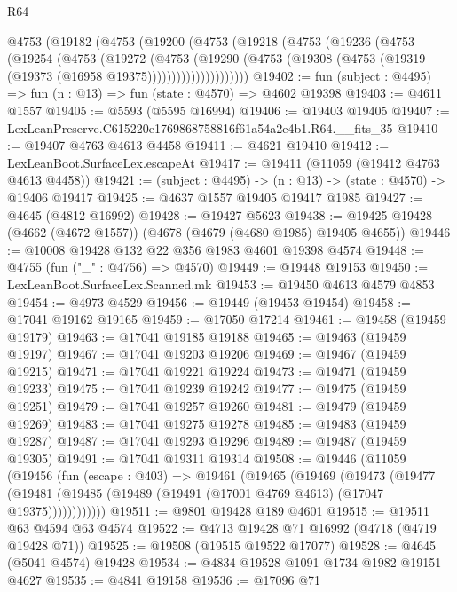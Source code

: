 \begin{lexlean}{R64}
\begin{coremodule}
      @4753
        (@19182
          (@4753
            (@19200
              (@4753
                (@19218
                  (@4753
                    (@19236
                      (@4753
                        (@19254
                          (@4753
                            (@19272
                              (@4753
                                (@19290
                                  (@4753
                                    (@19308
                                      (@4753 (@19319 (@19373 (@16958 @19375)))))))))))))))))))))
@19402 := fun (subject : @4495) => fun (n : @13) => fun (state : @4570) => @4602 @19398
@19403 := @4611 @1557
@19405 := @5593 (@5595 @16994)
@19406 := @19403 @19405
@19407 := LexLeanPreserve.C615220e1769868758816f61a54a2e4b1.R64.__fits_35
@19410 := @19407 @4763 @4613 @4458
@19411 := @4621 @19410
@19412 := LexLeanBoot.SurfaceLex.escapeAt
@19417 := @19411 (@11059 (@19412 @4763 @4613 @4458))
@19421 := (subject : @4495) -> (n : @13) -> (state : @4570) -> @19406 @19417
@19425 := @4637 @1557 @19405 @19417 @1985
@19427 := @4645 (@4812 @16992)
@19428 := @19427 @5623
@19438 := @19425 @19428 (@4662 (@4672 @1557)) (@4678 (@4679 (@4680 @1985) @19405 @4655))
@19446 := @10008 @19428 @132 @22 @356 @1983 @4601 @19398 @4574
@19448 := @4755 (fun ("_" : @4756) => @4570)
@19449 := @19448 @19153
@19450 := LexLeanBoot.SurfaceLex.Scanned.mk
@19453 := @19450 @4613 @4579 @4853
@19454 := @4973 @4529
@19456 := @19449 (@19453 @19454)
@19458 := @17041 @19162 @19165
@19459 := @17050 @17214
@19461 := @19458 (@19459 @19179)
@19463 := @17041 @19185 @19188
@19465 := @19463 (@19459 @19197)
@19467 := @17041 @19203 @19206
@19469 := @19467 (@19459 @19215)
@19471 := @17041 @19221 @19224
@19473 := @19471 (@19459 @19233)
@19475 := @17041 @19239 @19242
@19477 := @19475 (@19459 @19251)
@19479 := @17041 @19257 @19260
@19481 := @19479 (@19459 @19269)
@19483 := @17041 @19275 @19278
@19485 := @19483 (@19459 @19287)
@19487 := @17041 @19293 @19296
@19489 := @19487 (@19459 @19305)
@19491 := @17041 @19311 @19314
@19508 := @19446
    (@11059
      (@19456
        (fun (escape : @403) =>
        @19461
          (@19465
            (@19469
              (@19473
                (@19477
                  (@19481 (@19485 (@19489 (@19491 (@17001 @4769 @4613) (@17047 @19375))))))))))))
@19511 := @9801 @19428 @189 @4601
@19515 := @19511 @63 @4594 @63 @4574
@19522 := @4713 @19428 @71 @16992 (@4718 (@4719 @19428 @71))
@19525 := @19508 (@19515 @19522 @17077)
@19528 := @4645 (@5041 @4574) @19428
@19534 := @4834 @19528 @1091 @1734 @1982 @19151 @4627
@19535 := @4841 @19158
@19536 := @17096 @71

\end{coremodule}
\end{lexlean}

